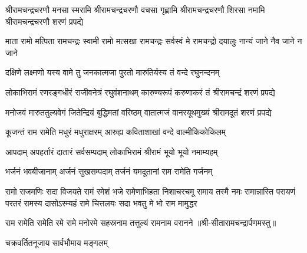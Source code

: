 \fourlineindentedshloka
{श्रीरामचन्द्रचरणौ मनसा स्मरामि}
{श्रीरामचन्द्रचरणौ वचसा गृह्णामि}
{श्रीरामचन्द्रचरणौ शिरसा नमामि}
{श्रीरामचन्द्रचरणौ शरणं प्रपद्ये}

\fourlineindentedshloka
{माता रामो मत्पिता रामचन्द्रः}
{स्वामी रामो मत्सखा रामचन्द्रः}
{सर्वस्वं मे रामचन्द्रो दयालुः}
{नान्यं जाने नैव जाने न जाने}

\twolineshloka
{दक्षिणे लक्ष्मणो यस्य वामे तु जनकात्मजा}
{पुरतो मारुतिर्यस्य तं वन्दे रघुनन्दनम्}

\fourlineindentedshloka
{लोकाभिरामं रणरङ्गधीरं}
{राजीवनेत्रं रघुवंशनाथम्}
{कारुण्यरूपं करुणाकरं तं}
{श्रीरामचन्द्रं शरणं प्रपद्ये}

\fourlineindentedshloka
{मनोजवं मारुततुल्यवेगं}
{जितेन्द्रियं बुद्धिमतां वरिष्ठम्}
{वातात्मजं वानरयूथमुख्यं}
{श्रीरामदूतं शरणं प्रपद्ये}

\twolineshloka
{कूजन्तं राम रामेति मधुरं मधुराक्षरम्}
{आरुह्य कविताशाखां वन्दे वाल्मीकिकोकिलम्}

\twolineshloka
{आपदाम् अपहर्तारं दातारं सर्वसम्पदाम्}
{लोकाभिरामं श्रीरामं भूयो भूयो नमाम्यहम्}

\twolineshloka
{भर्जनं भवबीजानाम् अर्जनं सुखसम्पदाम्}
{तर्जनं यमदूतानां राम रामेति गर्जनम्}

\fourlineindentedshloka
{रामो राजमणिः सदा विजयते रामं रमेशं भजे}
{रामेणाभिहता निशाचरचमू रामाय तस्मै नमः}
{रामान्नास्ति परायणं परतरं रामस्य दासोऽस्म्यहं}
{रामे चित्तलयः सदा भवतु मे भो राम मामुद्धर}

\twolineshloka
{राम रामेति रामेति रमे रामे मनोरमे}
{सहस्रनाम तत्तुल्यं रामनाम वरानने}
॥श्री-सीतारामचन्द्रार्पणमस्तु॥

\closesub

{चक्रवर्तितनूजाय सार्वभौमाय मङ्गलम्}